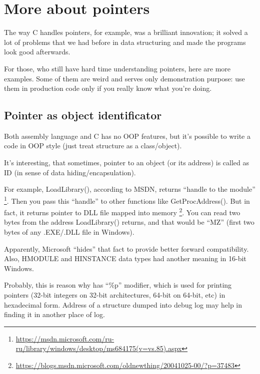 \section{More about pointers}
\myindex{\CLanguageElements!\Pointers}
\label{label_pointers}

\epigraph{The way C handles pointers, for example, was a brilliant innovation;
it solved a lot of problems that we had before in data structuring and
made the programs look good afterwards.}
{}

For those, who still have hard time understanding \CCpp pointers, here are more examples.
Some of them are weird and serves only demonstration purpose:
use them in production code only if you really know what you're doing.







\subsection{Pointer as object identificator}

Both assembly language and C has no \ac{OOP} features, but it's possible to write a code in \ac{OOP} style (just treat
structure as a class/object).

It's interesting, that sometimes, pointer to an object (or its address) is called as ID
(in sense of data hiding/encapsulation).

For example, LoadLibrary(), according to \ac{MSDN}, returns ``handle to the module''
\footnote{\url{https://msdn.microsoft.com/ru-ru/library/windows/desktop/ms684175(v=vs.85).aspx}}.
Then you pass this ``handle'' to other functions like GetProcAddress().
But in fact, it returns pointer to DLL file mapped into memory
\footnote{\url{https://blogs.msdn.microsoft.com/oldnewthing/20041025-00/?p=37483}}.
You can read two bytes from the address LoadLibrary() returns, and that would be ``MZ'' (first two bytes of any
.EXE/.DLL file in Windows).

Apparently, Microsoft ``hides'' that fact to provide better forward compatibility.
Also, HMODULE and HINSTANCE data types had another meaning in 16-bit Windows.

Probably, this is reason why \printf has ``\%p'' modifier, which is used for printing pointers (32-bit integers
on 32-bit architectures, 64-bit on 64-bit, etc) in hexadecimal form.
Address of a structure dumped into debug log may help in finding it in another place of log.

